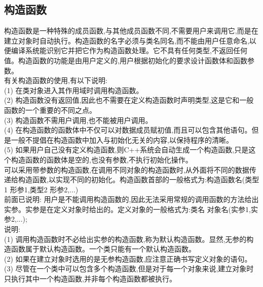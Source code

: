 \documentclass[11pt,a4paper,titlepage]{article}
\begin{document}
{\subsection{构造函数}
构造函数是一种特殊的成员函数,与其他成员函数不同,不需要用户来调用它,而是在建立对象时自动执行。构造函数的名字必须与类名同名,而不能由用户任意命名,以便编译系统能识别它并把它作为构造函数处理。它不具有任何类型,不返回任何值。构造函数的功能是由用户定义的,用户根据初始化的要求设计函数体和函数参数。\\
有关构造函数的使用,有以下说明:\\
(1) 在类对象进入其作用域时调用构造函数。\\
(2) 构造函数没有返回值,因此也不需要在定义构造函数时声明类型,这是它和一般函数的一个重要的不同之点。\\
(3) 构造函数不需用户调用,也不能被用户调用。\\
(4) 在构造函数的函数体中不仅可以对数据成员赋初值,而且可以包含其他语句。但是一般不提倡在构造函数中加入与初始化无关的内容,以保持程序的清晰。\\
(5) 如果用户自己没有定义构造函数,则C++系统会自动生成一个构造函数,只是这个构造函数的函数体是空的,也没有参数,不执行初始化操作。\\
可以采用带参数的构造函数,在调用不同对象的构造函数时,从外面将不同的数据传递给构造函数,以实现不同的初始化。构造函数首部的一般格式为:构造函数名(类型 1 形参1,类型2 形参2,...)\\
前面已说明: 用户是不能调用构造函数的,因此无法采用常规的调用函数的方法给出实参。实参是在定义对象时给出的。定义对象的一般格式为:类名 对象名(实参1,实参2,...);\\
说明:\\
(1) 调用构造函数时不必给出实参的构造函数,称为默认构造函数。显然,无参的构造函数属于默认构造函数。一个类只能有一个默认构造函数。\\
(2) 如果在建立对象时选用的是无参构造函数,应注意正确书写定义对象的语句。\\
(3) 尽管在一个类中可以包含多个构造函数,但是对于每一个对象来说,建立对象时只执行其中一个构造函数,并非每个构造函数都被执行。\\

}
\end{document}

